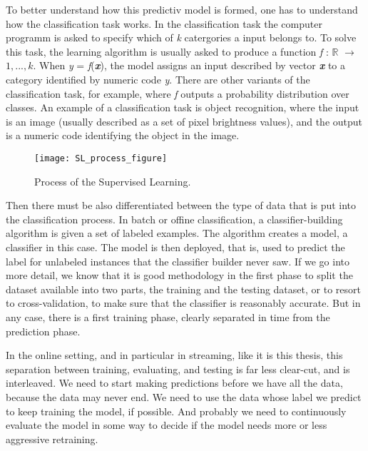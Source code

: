 \documentclass[12pt,oneside,a4paper,parskip]{scrbook}
\newcommand{\R}{\mathbb{R}}
\begin{document}
To better understand how this predictiv model is formed, one has to understand how the classification task works. 
In the classification task the computer programm is asked to specify which of \textit{k} catergories a input belongs to. 
To solve this task, the learning algorithm is usually asked to produce a function \textit{f} : $\R{}$ $\rightarrow$ ${1,...,k}$. 
When \textit{y} = \textit{f}(\textit{\textbf{x}}), the model assigns an input described by vector \textit{\textbf{x}} to a 
category identiﬁed by numeric code \textit{y}.
There are other variants of the classiﬁcation task, for example, where \textit{f} outputs a probability distribution over 
classes. An example of a classiﬁcation task is object recognition, where the input is an image (usually described as a set 
of pixel brightness values), and the output is a numeric code identifying the object in the image. \cite{Goodfellow-et-al-2016}

\pagebreak

\begin{figure}
  \texttt{[image: SL\_process\_figure]}
  \caption{Process of the Supervised Learning. \cite{PythonML}}
  \label{fig:sl_process}
\end{figure}

Then there must be also differentiated between the type of data that is put into the classification process.
In batch or offine classification, a classifier-building algorithm is given a set of labeled examples. 
The algorithm creates a model, a classifier in this case. The model is then deployed, that is, used to predict the label 
for unlabeled instances that the classifier builder never saw. If we go into more detail, we know that it is good 
methodology in the first phase to split the dataset available into two parts, the training and the testing dataset, 
or to resort to cross-validation, to make sure that the classifier is reasonably accurate.
But in any case, there is a first training phase, clearly separated in time from the prediction phase.

In the online setting, and in particular in streaming, like it is this thesis, this separation between training, 
evaluating, and testing is far less clear-cut, and is interleaved. We need to start making predictions before we have all 
the data, because the data may never end. We need to use the data whose label we predict to keep training the model, 
if possible. And probably we need to continuously evaluate the model in some way to decide if the model needs more or 
less aggressive retraining. \cite{MLonDataStreams}
\end{document}
